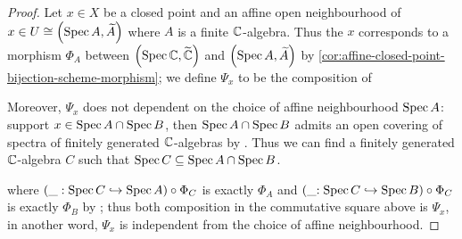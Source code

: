 \begin{proof}
  Let $x \in X$ be a closed point and an affine open neighbourhood of $x \in U \cong \left(\operatorname*{Spec}{A}, \widetilde{A}\right)$ where $A$ is a finite $\mathbb{C}$-algebra. Thus the $x$ corresponds to a morphism $\Phi_{A}$ between $\left(\operatorname*{Spec}{\mathbb{C}}, \widetilde{\mathbb{C}}\right)$ and $\left(\operatorname*{Spec}{A}, \widetilde{A}\right)$ by \cref{cor:affine-closed-point-bijection-scheme-morphism}; we define $\Psi_{x}$ to be the composition of
  \begin{center}
  \end{center}
  Moreover, $\Psi_{x}$ does not dependent on the choice of affine neighbourhood $\operatorname{Spec} A$: support $x \in \operatorname{Spec} A \cap \operatorname{Spec} B$, then $\operatorname{Spec} A \cap \operatorname{Spec} B$ admits an open covering of spectra of finitely generated $\mathbb{C}$-algebras by . Thus we can find a finitely generated $\mathbb{C}$-algebra $C$ such that $\operatorname{Spec} C \subseteq \operatorname{Spec} A \cap \operatorname{Spec} B$.
  \begin{center}
  \end{center}
  where $ (\_: \operatorname{Spec} C \hookrightarrow \operatorname{Spec} A) \circ \Phi_{C}$ is exactly $\Phi_{A}$ and $(\_{: \operatorname{Spec} C \hookrightarrow \operatorname{Spec} B}) \circ \Phi_{C}$ is exactly $\Phi_{B}$ by ; thus both composition in the commutative square above is $\Psi_{x}$, in another word, $\Psi_{x}$ is independent from the choice of affine neighbourhood.


\end{proof}
